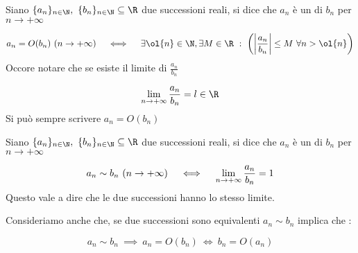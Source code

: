 \documentclass[../analisi.tex]{subfiles}
\begin{document}
\begin{defn}[O grande]
Siano $ \{ a_n \}_{n \in \N},\ \{ b_n \}_{n \in \N} \subseteq \R $ due successioni
reali, si dice che $a_n$ è un  di $b_n$ per $n \to + \infty$

\begin{equation}
	a_n = O(b_n)\ (n \to + \infty) \quad \iff \quad
	\exists \ol{n} \in \N, \exists M \in \R\ :\ \left(
	\left|\frac{a_n}{b_n}\right| \leq M\ \forall n > \ol{n} \right)
\end{equation}
Occore notare che se esiste il limite di $ \frac{a_n}{b_n} $


\begin{equation}
	\limm \frac{a_n}{b_n} = l \in \R
\end{equation}
Si può sempre scrivere $ a_n = O(b_n)$
\end{defn}

\begin{defn}
Siano $ \{ a_n \}_{n \in \N},\ \{ b_n \}_{n \in \N} \subseteq \R $ due successioni
reali, si dice che $a_n$ è un  di $b_n$ per $n \to + \infty$


\begin{equation}
	a_n \sim b_n \ (n \to + \infty) \quad \iff \quad
	\lim \limits_{n \to + \infty} \frac{a_n}{b_n} = 1
\end{equation}
Questo vale a dire che le due successioni hanno lo stesso limite.\\ 
\end{defn}
Consideriamo anche che, se due successioni sono equivalenti $ a_n \sim b_n $ implica
che :


\begin{equation} 
	a_n \sim b_n\ \implies \ a_n = O(b_n)\ \iff\ b_n=  O(a_n) 
\end{equation}
\end{document}
